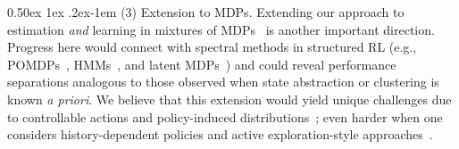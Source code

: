 \documentclass[twoside]{article}
\makeatletter
\renewcommand{\paragraph}{%
  \@startsection{paragraph}{4}%
  {\z@}{0.50ex \@plus 1ex \@minus .2ex}{-1em}%
  {\normalfont\normalsize\bfseries}%
}
\theoremstyle{plain}
\makeatother
\begin{document}
\paragraph{(3) Extension to MDPs.}
Extending our approach to estimation \emph{and} learning in mixtures of MDPs~\citep{banerjee2025markov,kausik2023mixture} is another important direction.
Progress here would connect with spectral methods in structured RL (e.g., POMDPs~\citep{azizzadenesheli2016spectral,azizzadenesheli2017spectral,jedra2023bmdp}, HMMs~\citep{anandkumar2012hmm,hsu2012hmm}, and latent MDPs~\citep{kwon2021lmdp,kwon2024lmdp1,kwon2024lmdp2}) and could reveal performance separations analogous to those observed when state abstraction or clustering is known \emph{a priori}.
We believe that this extension would yield unique challenges due to controllable actions and policy-induced distributions~\citep{jedra2023bmdp}; even harder when one considers history-dependent policies and active exploration-style approaches~\citep{tarbouriech2019active,tarbouriech2020active}.
\end{document}
